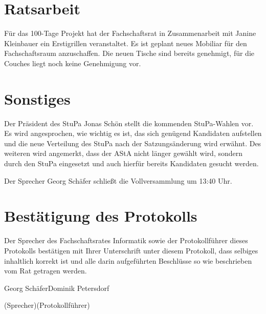 \documentclass[a4paper, 11pt]{article} %
\newcommand{\TeXer}{Dominik Petersdorf}
\newcommand{\fsiPresident}{Georg Schäfer}
\begin{document}
\section{Ratsarbeit}
\begin{flushleft}
	Für das 100-Tage Projekt hat der Fachschaftsrat in Zusammenarbeit mit Janine Kleinbauer ein Erstigrillen veranstaltet. Es ist geplant neues Mobiliar für den Fachschaftsraum anzuschaffen. Die neuen Tische sind bereits genehmigt, für die Couches liegt noch keine Genehmigung vor. 
\end{flushleft}
\section{Sonstiges}
\begin{flushleft}
	Der Präsident des StuPa Jonas Schön stellt die kommenden StuPa-Wahlen vor. Es wird angesprochen, wie wichtig es ist, das sich genügend Kandidaten aufstellen und die neue Verteilung des StuPa nach der Satzungsänderung wird erwähnt.
	\newline
	Des weiteren wird angemerkt, dass der AStA nicht länger gewählt wird, sondern durch den StuPa eingesetzt und auch hierfür bereits Kandidaten gesucht werden. 
\end{flushleft}
  

Der Sprecher Georg Schäfer schließt die Vollversammlung um 13:40 Uhr.

\pagebreak
\section{Bestätigung des Protokolls}
Der Sprecher des Fachschaftsrates Informatik sowie der Protokollführer dieses Protokolls bestätigen mit Ihrer Unterschrift unter diesem Protokoll, dass selbiges inhaltlich korrekt ist und alle darin aufgeführten Beschlüsse so wie beschrieben vom Rat getragen werden.
\\
\vspace{1.5cm}


\vspace{3.5cm}
\hrulefill \hfill \hrulefill

\fsiPresident \hfill \TeXer

{\footnotesize (Sprecher)\hfill (Protokollführer)}
\end{document}
